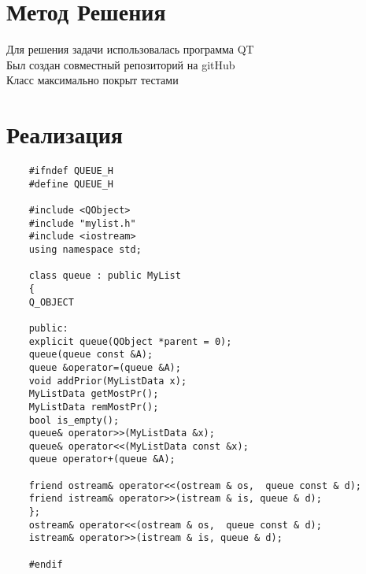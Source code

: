\documentclass[12pt]{report}
\begin{document}
\section{Метод Решения}
Для решения задачи использовалась программа QT\\
Был создан совместный репозиторий на gitHub\\
Класс максимально покрыт тестами\\ 
	
\section{Реализация}
\lstset{language=C++,style=customc}  
\begin{lstlisting}
	#ifndef QUEUE_H
	#define QUEUE_H
	
	#include <QObject>
	#include "mylist.h"
	#include <iostream>
	using namespace std;
	
	class queue : public MyList
	{
	Q_OBJECT
	
	public:
	explicit queue(QObject *parent = 0);
	queue(queue const &A);
	queue &operator=(queue &A);
	void addPrior(MyListData x);
	MyListData getMostPr();
	MyListData remMostPr();
	bool is_empty();  
	queue& operator>>(MyListData &x);
	queue& operator<<(MyListData const &x); 
	queue operator+(queue &A);
	
	friend ostream& operator<<(ostream & os,  queue const & d);
	friend istream& operator>>(istream & is, queue & d);
	};
	ostream& operator<<(ostream & os,  queue const & d);
	istream& operator>>(istream & is, queue & d);
	
	#endif 
\end{lstlisting}
\end{document}
